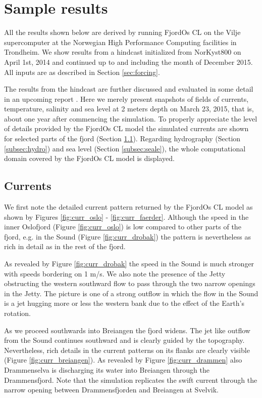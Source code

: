 \section{Sample results}
\label{sec:resul}
All the results shown below are derived by running FjordOs CL on the Vilje supercomputer at the Norwegian High Performance Computing facilities in Trondheim. We show results from a hindcast initialized from NorKyst800 on April 1st, 2014 and continued up to and including the month of December 2015. All inputs are as described in Section \ref{sec:forcing}.
 
The results from the hindcast are further discussed and evaluated in some detail in an upcoming report \citep{hjelm:etal:2016}. Here we merely present snapshots of fields of currents, temperature, salinity and sea level at 2 meters depth on March 23, 2015, that is, about one year after commencing the simulation. To properly appreciate the level of details provided by the FjordOs CL model the simulated currents are shown for selected parts of the fjord (Section \ref{subsec:curre}). Regarding hydrography (Section \ref{subsec:hydro}) and sea level (Section \ref{subsec:seale}), the whole computational domain covered by the FjordOs CL model is displayed.

\subsection{Currents}
\label{subsec:curre}
We first note the detailed current pattern returned by the FjordOs CL model as shown by Figures \ref{fig:curr_oslo} - \ref{fig:curr_faerder}. Although the speed in the inner Oslofjord (Figure \ref{fig:curr_oslo}) is low compared to other parts of the fjord, e.g. in the {\DR} Sound (Figure \ref{fig:curr_drobak}) the pattern is nevertheless as rich in detail as in the rest of the fjord. 
 
 
   

As revealed by Figure \ref{fig:curr_drobak} the speed in the {\DR} Sound is much stronger with speeds bordering on 1 m/s. We also note the presence of the Jetty obstructing the western southward flow to pass through the two narrow openings in the Jetty. The picture is one of a strong outflow in which the flow in the {\DR} Sound is a jet hugging more or less the western bank due to the effect of the Earth's rotation.   

As we proceed southwards into Breiangen the fjord widens. The jet like outflow from the {\DR} Sound continues southward and is clearly guided by the topography. Nevertheless, rich details in the current patterns on its flanks  are clearly visible (Figure \ref{fig:curr_breiangen}). As revealed by Figure \ref{fig:curr_drammen} also Drammenselva is discharging its water into Breiangen through the Drammensfjord. Note that the simulation replicates the swift current through the narrow opening between Drammensfjorden and Breiangen at Svelvik.  
% 
 

